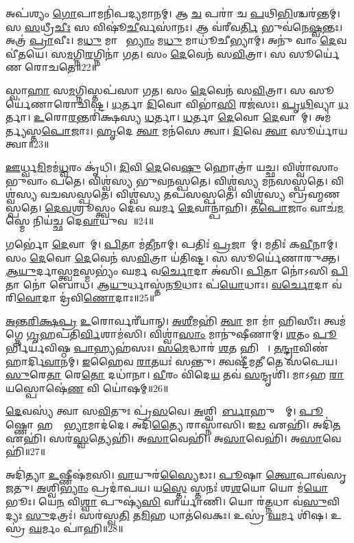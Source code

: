 𑌅𑌪॑𑌶𑍍𑌯𑌂 \ul{𑌗𑍋}𑌪𑌾𑌮𑌨𑌿॑𑌪𑌦𑍍𑌯𑌮𑌾𑌨𑌮𑍍। 
𑌆 \ul{𑌚} 𑌪𑌰𑌾॑ 𑌚 \ul{𑌪}𑌥𑌿\ul{𑌭𑌿}𑌶𑍍𑌚𑌰॑𑌨𑍍𑌤𑌮𑍍। 
𑌸 \ul{𑌸}𑌧𑍍𑌰𑍀\ul{𑌚𑍀𑌃} 𑌸 𑌵𑌿𑌷𑍂॑\ul{𑌚𑍀}𑌰𑍍𑌵𑌸𑌾॑𑌨𑌃। 
𑌆 𑌵॑𑌰𑍀𑌵\ul{𑌰𑍍𑌤𑌿} 𑌭𑍁𑌵॑𑌨𑍇\ul{𑌷𑍍𑌵}𑌨𑍍𑌤𑌃। 
𑌅𑌤𑍍𑌰॑ \ul{𑌪𑍍𑌰𑌾}𑌵𑍀𑌃। 
𑌮\ul{𑌧𑍁} 𑌮𑌾𑌧𑍍𑌵𑍀᳚\ul{𑌭𑍍𑌯𑌾𑌂} 𑌮\ul{𑌧𑍁} 𑌮𑌾𑌧𑍂॑𑌚𑍀𑌭𑍍𑌯𑌾𑌮𑍍। 
𑌅𑌨𑍁॑ 𑌵𑌾𑌂 \ul{𑌦𑍇}𑌵𑌵𑍀॑𑌤𑌯𑍇। 
𑌸\ul{𑌮}𑌗𑍍𑌨𑌿\ul{𑌰}𑌗𑍍𑌨𑌿𑌨𑌾॑ 𑌗𑌤। 
𑌸𑌂 \ul{𑌦𑍇}𑌵𑍇𑌨॑ 𑌸\ul{𑌵𑌿}𑌤𑍍𑌰𑌾। 
𑌸 𑌸𑍂𑌰𑍍𑌯𑍇॑𑌣 𑌰𑍋𑌚𑌤𑍇॥22॥

𑌸𑍍𑌵𑌾\ul{𑌹𑌾} 𑌸\ul{𑌮}𑌗𑍍𑌨𑌿𑌸𑍍𑌤𑌪॑𑌸𑌾 𑌗𑌤। 
𑌸𑌂 \ul{𑌦𑍇}𑌵𑍇𑌨॑ 𑌸\ul{𑌵𑌿}𑌤𑍍𑌰𑌾। 
𑌸 𑌸𑍂𑌰𑍍𑌯𑍇॑𑌣𑌾𑌰𑍋𑌚𑌿𑌷𑍍𑌟। 
\ul{𑌧}𑌰𑍍𑌤𑌾 \ul{𑌦𑌿}𑌵𑍋 𑌵𑌿𑌭𑌾॑\ul{𑌸𑌿} 𑌰𑌜॑𑌸𑌃। 
\ul{𑌪𑍃}\ul{𑌥𑌿}𑌵𑍍𑌯𑌾 \ul{𑌧}𑌰𑍍𑌤𑌾। 
\ul{𑌉}𑌰𑍋\ul{𑌰}𑌨𑍍𑌤𑌰𑌿॑𑌕𑍍𑌷𑌸𑍍𑌯 \ul{𑌧}𑌰𑍍𑌤𑌾। 
\ul{𑌧}𑌰𑍍𑌤𑌾 \ul{𑌦𑍇}𑌵𑍋 \ul{𑌦𑍇}𑌵𑌾𑌨𑌾᳚𑌮𑍍। 
𑌅𑌮॑𑌰𑍍𑌤𑍍𑌯𑌸𑍍𑌤\ul{𑌪𑍋}𑌜𑌾𑌃। 
\ul{𑌹𑍃}𑌦𑍇 \ul{𑌤𑍍𑌵𑌾} 𑌮𑌨॑𑌸𑍇 𑌤𑍍𑌵𑌾। 
\ul{𑌦𑌿}𑌵𑍇 \ul{𑌤𑍍𑌵𑌾} 𑌸𑍂𑌰𑍍𑌯𑌾॑𑌯 𑌤𑍍𑌵𑌾॥23॥

\ul{𑌊}𑌰𑍍𑌧𑍍𑌵\ul{𑌮𑌿}𑌮𑌮॑\ul{𑌧𑍍𑌵}𑌰𑌂 𑌕𑍃॑𑌧𑌿। 
\ul{𑌦𑌿}𑌵𑌿 \ul{𑌦𑍇}𑌵𑍇\ul{𑌷𑍁} 𑌹𑍋𑌤𑍍𑌰𑌾॑ 𑌯𑌚𑍍𑌛। 
𑌵𑌿𑌶𑍍𑌵𑌾॑𑌸𑌾𑌂 𑌭𑍁𑌵𑌾𑌂 𑌪𑌤𑍇। 
𑌵𑌿𑌶𑍍𑌵॑𑌸𑍍𑌯 𑌭𑍁𑌵𑌨𑌸𑍍𑌪𑌤𑍇। 
𑌵𑌿𑌶𑍍𑌵॑𑌸𑍍𑌯 𑌮𑌨𑌸𑌸𑍍𑌪𑌤𑍇। 
𑌵𑌿𑌶𑍍𑌵॑𑌸𑍍𑌯 𑌵𑌚𑌸𑌸𑍍𑌪𑌤𑍇। 
𑌵𑌿𑌶𑍍𑌵॑𑌸𑍍𑌯 𑌤𑌪𑌸𑌸𑍍𑌪𑌤𑍇। 
𑌵𑌿𑌶𑍍𑌵॑𑌸𑍍𑌯 𑌬𑍍𑌰𑌹𑍍𑌮𑌣𑌸𑍍𑌪𑌤𑍇। 
\ul{𑌦𑍇}\ul{𑌵}𑌶𑍍𑌰𑍂𑌸𑍍𑌤𑍍𑌵𑌂 𑌦𑍇॑𑌵 𑌘𑌰𑍍𑌮 \ul{𑌦𑍇}𑌵𑌾𑌨𑍍𑌪𑌾॑𑌹𑌿। 
\ul{𑌤}\ul{𑌪𑍋}𑌜𑌾𑌂 𑌵𑌾𑌚॑\ul{𑌮}𑌸𑍍𑌮𑍇 𑌨𑌿𑌯॑𑌚𑍍𑌛 𑌦𑍇\ul{𑌵𑌾}𑌯𑍁𑌵𑌮𑍍᳚॥24॥

𑌗𑌰𑍍𑌭𑍋॑ \ul{𑌦𑍇}𑌵𑌾𑌨𑌾᳚𑌮𑍍। 
\ul{𑌪𑌿}𑌤𑌾 𑌮॑\ul{𑌤𑍀}𑌨𑌾𑌮𑍍। 
𑌪𑌤𑌿𑌃॑ \ul{𑌪𑍍𑌰}𑌜𑌾𑌨𑌾᳚𑌮𑍍। 
𑌮𑌤𑌿𑌃॑ 𑌕\ul{𑌵𑍀}𑌨𑌾𑌮𑍍। 
𑌸𑌂 \ul{𑌦𑍇}𑌵𑍋 \ul{𑌦𑍇}𑌵𑍇𑌨॑ 𑌸\ul{𑌵𑌿}𑌤𑍍𑌰𑌾 𑌯॑𑌤𑌿𑌷𑍍𑌟। 
𑌸 𑌸𑍂𑌰𑍍𑌯𑍇॑𑌣𑌾𑌰𑍁𑌕𑍍𑌤। 
\ul{𑌆}\ul{𑌯𑍁}𑌰𑍍𑌦𑌾𑌸𑍍𑌤𑍍𑌵\ul{𑌮}𑌸𑍍𑌮𑌭𑍍𑌯𑌂॑ 𑌘𑌰𑍍𑌮 𑌵\ul{𑌰𑍍𑌚𑍋}𑌦𑌾 𑌅॑𑌸𑌿। 
\ul{𑌪𑌿}𑌤𑌾 𑌨𑍋॑𑌽𑌸𑌿 \ul{𑌪𑌿}𑌤𑌾 𑌨𑍋॑ 𑌬𑍋𑌧। 
\ul{𑌆}\ul{𑌯𑍁}𑌰𑍍𑌧𑌾𑌸𑍍𑌤॑\ul{𑌨𑍂}𑌧𑌾𑌃 𑌪॑\ul{𑌯𑍋}𑌧𑌾𑌃। 
\ul{𑌵}\ul{𑌰𑍍𑌚𑍋}𑌦𑌾 𑌵॑𑌰𑌿\ul{𑌵𑍋}𑌦𑌾 𑌦𑍍𑌰॑𑌵𑌿\ul{𑌣𑍋}𑌦𑌾𑌃॥25॥

\ul{𑌅}\ul{𑌨𑍍𑌤}\ul{𑌰𑌿}\ul{𑌕𑍍𑌷}\ul{𑌪𑍍𑌰} \ul{𑌉}𑌰𑍋𑌰𑍍𑌵𑌰𑍀॑𑌯𑌾𑌨𑍍। 
\ul{𑌅}\ul{𑌶𑍀}𑌮𑌹𑌿॑ \ul{𑌤𑍍𑌵𑌾} 𑌮𑌾 𑌮𑌾॑ 𑌹𑌿𑌸𑍀𑌃। 
𑌤𑍍𑌵𑌮॑𑌗𑍍𑌨𑍇 \ul{𑌗𑍃}𑌹𑌪॑𑌤𑌿\ul{𑌰𑍍𑌵𑌿}𑌶𑌾𑌮॑𑌸𑌿। 
𑌵𑌿𑌶𑍍𑌵𑌾॑\ul{𑌸𑌾𑌂} 𑌮𑌾𑌨𑍁॑𑌷𑍀𑌣𑌾𑌮𑍍। 
\ul{𑌶}𑌤𑌂 \ul{𑌪𑍂}𑌰𑍍𑌭𑌿𑌰𑍍𑌯॑𑌵𑌿𑌷𑍍𑌠 \ul{𑌪𑌾}𑌹𑍍𑌯𑌹॑𑌸𑌃। 
\ul{𑌸}\ul{𑌮𑍇}𑌦𑍍𑌧𑌾𑌰॑ \ul{𑌶}𑌤 𑌹𑌿𑌮𑌾𑌃᳚। 
\ul{𑌤}\ul{𑌨𑍍𑌦𑍍𑌰𑌾}𑌵𑌿𑌣॑ 𑌹𑌾𑌰𑍍𑌦𑌿\ul{𑌵𑌾}𑌨𑌮𑍍। 
\ul{𑌇}𑌹𑍈𑌵 \ul{𑌰𑌾}𑌤𑌯𑌃॑ 𑌸𑌨𑍍𑌤𑍁। 
𑌤𑍍𑌵𑌷𑍍𑌟𑍀॑𑌮𑌤𑍀 𑌤𑍇 𑌸𑌪𑍇𑌯। 
\ul{𑌸𑍁}𑌰𑍇\ul{𑌤𑌾} 𑌰𑍇\ul{𑌤𑍋} 𑌦𑌧𑌾॑𑌨𑌾। 
\ul{𑌵𑍀}𑌰𑌂  𑌵𑌿॑𑌦𑍇\ul{𑌯} 𑌤𑌵॑ \ul{𑌸}𑌨𑍍𑌦𑍃𑌶𑌿॑। 
𑌮𑌾𑌽𑌹 \ul{𑌰𑌾}𑌯𑌸𑍍𑌪𑍋𑌷𑍇॑\ul{𑌣} 𑌵𑌿 𑌯𑍋॑𑌷𑌮𑍍॥26॥
\anuvakamend[\ul{𑌰𑍋}\ul{𑌚}\ul{𑌤𑍇} 𑌸𑍂𑌰𑍍𑌯𑌾॑𑌯 𑌤𑍍𑌵𑌾 𑌦𑍇\ul{𑌵𑌾}𑌯𑍁𑌵𑌂॑ 𑌦𑍍𑌰𑌵𑌿\ul{𑌣𑍋}𑌦𑌾 𑌦𑌧𑌾॑\ul{𑌨𑌾} 𑌦𑍍𑌵𑍇 𑌚॑]


\ul{𑌦𑍇}𑌵𑌸𑍍𑌯॑ 𑌤𑍍𑌵𑌾 𑌸\ul{𑌵𑌿}𑌤𑍁𑌃 𑌪𑍍𑌰॑\ul{𑌸}𑌵𑍇। 
\ul{𑌅}𑌶𑍍𑌵𑌿𑌨𑍋᳚\ul{𑌰𑍍𑌬𑌾}𑌹𑍁𑌭𑍍𑌯𑌾᳚𑌮𑍍। 
\ul{𑌪𑍂}𑌷𑍍𑌣𑍋 𑌹𑌸𑍍𑌤𑌾᳚\ul{𑌭𑍍𑌯𑌾}𑌮𑌾𑌦॑𑌦𑍇। 
𑌅𑌦𑌿॑\ul{𑌤𑍍𑌯𑍈} 𑌰𑌾𑌸𑍍𑌨𑌾॑𑌸𑌿। 
𑌇\ul{𑌡} 𑌏𑌹𑌿॑। 
𑌅𑌦𑌿॑\ul{𑌤} 𑌏𑌹𑌿॑। 
𑌸𑌰॑\ul{𑌸𑍍𑌵}𑌤𑍍𑌯𑍇𑌹𑌿॑। 
𑌅\ul{𑌸𑌾}𑌵𑍇𑌹𑌿॑। 
𑌅\ul{𑌸𑌾}𑌵𑍇𑌹𑌿॑। 
𑌅\ul{𑌸𑌾}𑌵𑍇𑌹𑌿॑॥27॥

𑌅𑌦𑌿॑𑌤𑍍𑌯𑌾 \ul{𑌉}𑌷𑍍𑌣𑍀𑌷॑𑌮𑌸𑌿। 
\ul{𑌵𑌾}𑌯𑍁𑌰॑\ul{𑌸𑍍𑌯𑍈}𑌡𑌃। 
\ul{𑌪𑍂}𑌷𑌾 \ul{𑌤𑍍𑌵𑍋}𑌪𑌾𑌵॑𑌸𑍃𑌜𑌤𑍁। 
\ul{𑌅}𑌶𑍍𑌵𑌿\ul{𑌭𑍍𑌯𑌾𑌂} 𑌪𑍍𑌰𑌦𑌾॑𑌪𑌯। 
𑌯\ul{𑌸𑍍𑌤𑍇} 𑌸𑍍𑌤𑌨𑌃॑ 𑌶\ul{𑌶}𑌯𑍋 𑌯𑍋 𑌮॑\ul{𑌯𑍋}𑌭𑍂𑌃। 
𑌯𑍇\ul{𑌨} 𑌵𑌿\ul{𑌶𑍍𑌵𑌾} 𑌪𑍁𑌷𑍍𑌯॑\ul{𑌸𑌿} 𑌵𑌾𑌰𑍍𑌯𑌾॑𑌣𑌿। 
𑌯𑍋 𑌰॑\ul{𑌤𑍍𑌨}𑌧𑌾 𑌵॑\ul{𑌸𑍁}𑌵𑌿𑌦𑍍𑌯𑌃 \ul{𑌸𑍁}𑌦𑌤𑍍𑌰𑌃॑। 
𑌸𑌰॑𑌸𑍍𑌵\ul{𑌤𑌿} 𑌤\ul{𑌮𑌿}𑌹 𑌧𑌾𑌤॑𑌵𑍇𑌕𑌃। 
𑌉𑌸𑍍𑌰॑ \ul{𑌘}𑌰𑍍𑌮 𑌶𑌿॑𑌷। 
𑌉𑌸𑍍𑌰॑ \ul{𑌘}𑌰𑍍𑌮𑌂 𑌪𑌾॑𑌹𑌿॥28॥

